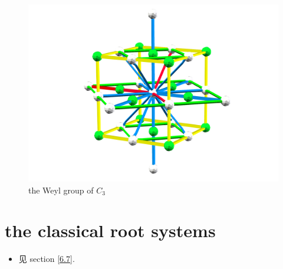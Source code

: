 \begin{itemize}
	\begin{figure}[H]
		\centering
		\includegraphics[scale=0.15]{figures/the Weyl group of C3.pdf}
		\caption{the Weyl group of $C_3$}
	\end{figure}
\end{itemize}

\section{the classical root systems}
\begin{itemize}
	\item 见 section \ref{6.7}.
\end{itemize}


